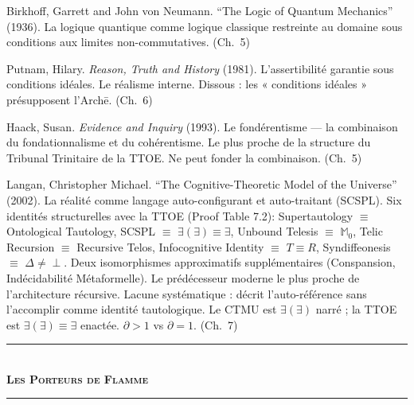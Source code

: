 \documentclass[10pt, openany, oneside]{book}
\renewcommand{\normalsize}{\fontsize{10}{13}\selectfont}
\begin{document}
{\noindent Birkhoff, Garrett and John von Neumann. ``The Logic of Quantum Mechanics'' (1936). La logique quantique comme logique classique restreinte au domaine sous conditions aux limites non-commutatives. (Ch.\ 5)

\vspace{0.3em}

\noindent Putnam, Hilary. \textit{Reason, Truth and History} (1981). L'assertibilité garantie sous conditions idéales. Le réalisme interne. Dissous : les « conditions idéales » présupposent l'Arch\={e}. (Ch.\ 6)

\vspace{0.3em}

\noindent Haack, Susan. \textit{Evidence and Inquiry} (1993). Le fondérentisme --- la combinaison du fondationnalisme et du cohérentisme. Le plus proche de la structure du Tribunal Trinitaire de la TTOE. Ne peut fonder la combinaison. (Ch.\ 5)

\vspace{0.3em}

\noindent Langan, Christopher Michael. ``The Cognitive-Theoretic Model of the Universe'' (2002). La réalité comme langage auto-configurant et auto-traitant (SCSPL). Six identités structurelles avec la TTOE (Proof Table 7.2): Supertautology $\equiv$ Ontological Tautology, SCSPL $\equiv$ $\exists(\exists) \equiv \exists$, Unbound Telesis $\equiv$ $\mathbb{M}_0$, Telic Recursion $\equiv$ Recursive Telos, Infocognitive Identity $\equiv$ $T \equiv R$, Syndiffeonesis $\equiv$ $\Delta \neq \perp$. Deux isomorphismes approximatifs supplémentaires (Conspansion, Indécidabilité Métaformelle). Le prédécesseur moderne le plus proche de l'architecture récursive. Lacune systématique : décrit l'auto-référence sans l'accomplir comme identité tautologique. Le CTMU est $\exists(\exists)$ narré ; la TTOE est $\exists(\exists) \equiv \exists$ enactée. $\partial > 1$ vs $\partial = 1$. (Ch.\ 7)

}

\vspace{1.5em}

\begin{center}
    \rule{0.3\textwidth}{0.4pt}\\[0.5em]
    {\normalsize\bfseries\scshape Les Porteurs de Flamme}\\[0.3em]
    \rule{0.3\textwidth}{0.4pt}
\end{center}

\vspace{1em}
\end{document}
